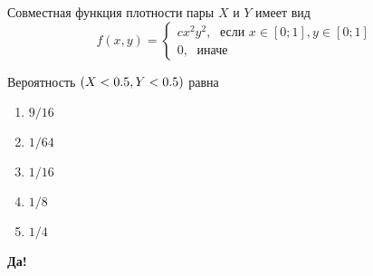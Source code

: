 \documentclass[t]{beamer}
\let\P\relax
\DeclareMathOperator{\P}{\mathbb{P}}
\begin{document}
 \begin{frame} \label{21-Yes} 
\begin{block}{21} 

Совместная функция плотности пары $X$ и $Y$ имеет вид
\[
f(x,y)=\begin{cases}
cx^2y^2, \; \text{ если } x\in[0;1], y\in [0;1] \\
0, \; \text{ иначе}
\end{cases}
\]

\vspace{0.5cm} 
 
 
Вероятность $\P(X<0.5, Y<0.5)$ равна
 


 \end{block} 
\begin{enumerate} 
\item[] \hyperlink{21-No}{\beamergotobutton{} $9/16$
}
\item[] \hyperlink{21-Yes}{\beamergotobutton{} $1/64$}
\item[] \hyperlink{21-No}{\beamergotobutton{} $1/16$}
\item[] \hyperlink{21-No}{\beamergotobutton{} $1/8$}
\item[] \hyperlink{21-No}{\beamergotobutton{} $1/4$}
\end{enumerate} 

 \textbf{Да!} 
 \hyperlink{22}{}\end{frame} 
\end{document}
